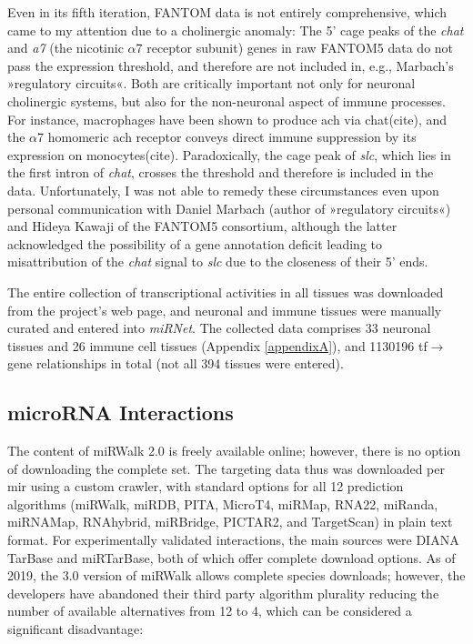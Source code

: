 Even in its fifth iteration, FANTOM data is not entirely comprehensive, which came to my attention due to a cholinergic anomaly: The 5' \ac{cage} peaks of the \textit{\ac{chat}} and \textit{\acs{a7}} (the nicotinic $\alpha$7 receptor subunit) genes in raw FANTOM5 data do not pass the expression threshold, and therefore are not included in, e.g., Marbach's »regulatory circuits«. Both are critically important not only for neuronal cholinergic systems, but also for the non-neuronal aspect of immune processes. For instance, macrophages have been shown to produce \ac{ach} via \ac{chat}(cite), and the $\alpha$7 homomeric \ac{ach} receptor conveys direct immune suppression by its expression on monocytes(cite). Paradoxically, the \ac{cage} peak of \textit{\ac{slc}}, which lies in the first intron of \textit{\ac{chat}}, crosses the threshold and therefore is included in the data. Unfortunately, I was not able to remedy these circumstances even upon personal communication with Daniel Marbach (author of »regulatory circuits«) and Hideya Kawaji of the FANTOM5 consortium, although the latter acknowledged the possibility of a gene annotation deficit leading to misattribution of the \textit{\ac{chat}} signal to \textit{\ac{slc}} due to the closeness of their 5' ends.

The entire collection of transcriptional activities in all tissues was downloaded from the project's web page\cite{Marbach2016}, and neuronal and immune tissues were manually curated and entered into \textit{miRNet}. The collected data comprises 33 neuronal tissues and 26 immune cell tissues (Appendix \ref{appendixA}), and \num{1130196} \ac{tf}$\to$gene relationships in total (not all 394 tissues were entered). 

\subsection{microRNA Interactions} \label{sec:database:mirna}
The content of miRWalk 2.0 is freely available online\cite{miRWalk2}; however, there is no option of downloading the complete set. The targeting data thus was downloaded per \ac{mir} using a custom crawler, with standard options for all 12 prediction algorithms (miRWalk, miRDB, PITA, MicroT4, miRMap, RNA22, miRanda, miRNAMap, RNAhybrid, miRBridge, PICTAR2, and TargetScan) in plain text format. For experimentally validated interactions, the main sources were DIANA TarBase\cite{Karagkouni2018} and miRTarBase\cite{Chou2018}, both of which offer complete download options. As of 2019, the 3.0 version of miRWalk allows complete species downloads; however, the developers have abandoned their third party algorithm plurality reducing the number of available alternatives from 12 to 4, which can be considered a significant disadvantage:

